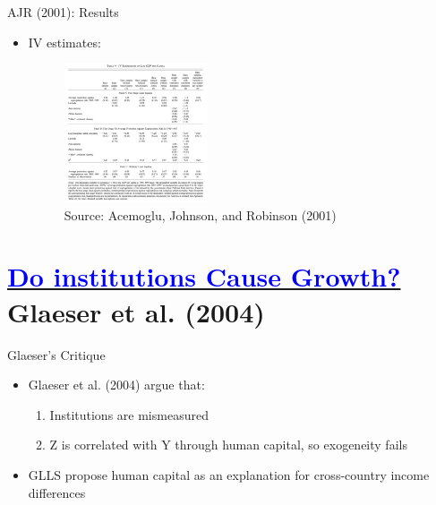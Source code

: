 \documentclass[11pt,notes=hide,aspectratio=169,mathserif]{beamer}
\begin{document}
\begin{frame}{AJR (2001): Results}
\begin{itemize}
\item IV estimates:
\begin{figure}
\centering
\includegraphics[width=0.4\textwidth]{inputs/AJR4.png}
\caption{Source: Acemoglu, Johnson, and Robinson (2001)}
\end{figure}
\end{itemize}
\end{frame}

\section*{\href{https://scholar.harvard.edu/files/shleifer/files/do_institutions_cause_growth.pdf}{\textcolor{blue}{Do institutions Cause Growth?}} \\ Glaeser et al. (2004)}

\begin{frame}{Glaeser's Critique}
\begin{itemize}
\item Glaeser et al. (2004) argue that:
\begin{enumerate}
    \item Institutions are mismeasured
    \item Z is correlated with Y through human capital, so exogeneity fails
\end{enumerate}
\item GLLS propose human capital as an explanation for cross-country income differences
\end{itemize}
\end{frame}
\end{document}
